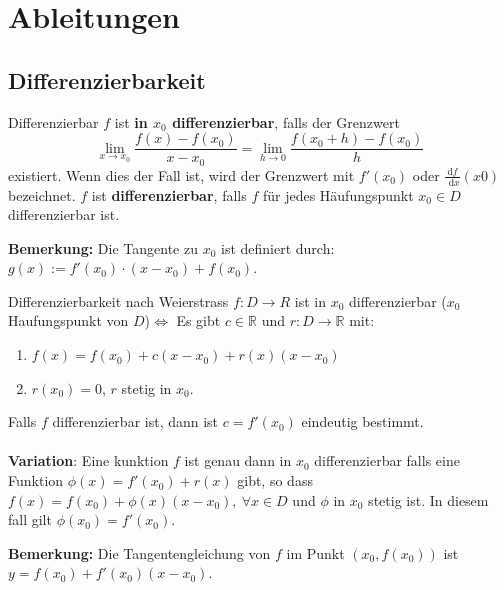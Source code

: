 \documentclass[a4paper,8pt]{extarticle}
\newenvironment{bemerkung}{
   \noindent \textbf{Bemerkung:  }}{}
\def\R{\mathbb{R}}
\def\dx{\text{ d}x}
\begin{document}
\section{Ableitungen}
\subsection{Differenzierbarkeit}
\begin{mainbox}{Differenzierbar}
 $f$ ist \textbf{in $x_0$ differenzierbar}, falls der Grenzwert $$\lim_{x\to x_0} \frac{f(x) - f(x_0)}{x - x_0} = \lim_{h \to 0} \frac{f(x_0 + h) - f(x_0)}{h}$$ existiert. Wenn dies der Fall ist, wird der Grenzwert mit $f'(x_0)$ oder $\frac{\text{d}f}{\dx}(x0)$ bezeichnet. $f$ ist \textbf{differenzierbar}, falls $f$ für jedes Häufungspunkt $x_0 \in D$ differenzierbar ist.
\end{mainbox}

\begin{bemerkung}
  Die Tangente zu $x_0$ ist definiert durch: $g(x) := f'(x_0) \cdot (x - x_0) + f(x_0)$.
\end{bemerkung}

\begin{subbox}{Differenzierbarkeit nach Weierstrass}
 $f: D \rightarrow R$ ist in $x_0$ differenzierbar ($x_0$ Haufungspunkt von $D$)$\iff$ Es gibt $c \in \R$ und $r: D \to \R$ mit:
 \begin{enumerate}
   \item $f(x) = f(x_0) + c(x - x_0) + r(x) (x - x_0)$ 
   \item $r(x_0) = 0$, $r$ stetig in $x_0$.
 \end{enumerate}
 Falls $f$ differenzierbar ist, dann ist $c = f'(x_0)$ eindeutig bestimmt. \\ \\
 \textbf{Variation}: Eine kunktion $f$ ist genau dann in $x_0$ differenzierbar falls eine Funktion $\phi(x) = f'(x_0) + r(x)$ gibt, so dass $f(x) = f(x_0) + \phi(x) (x-x_0), \ \forall x \in D$ und $\phi$ in $x_0$ stetig ist. In diesem fall gilt $\phi(x_0) = f'(x_0)$.
\end{subbox}
\begin{bemerkung}
  Die Tangentengleichung von $f$ im Punkt $(x_0, f(x_0))$ ist $y = f(x_0) + f'(x_0)(x - x_0)$.
\end{bemerkung}
\end{document}
